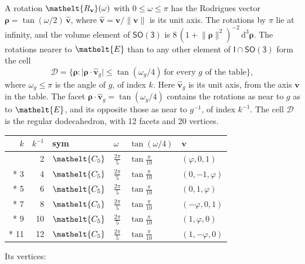 \documentclass[10pt,a4paper]{article}
\numberwithin{equation}{section}
\newcommand{\eltfont}[1]{{\let\sigma\eltsigma\mathelt{#1}}}
\newcommand{\grp}[1]{\mathsf{#1}}
\newcommand{\cls}[1]{\eltfont{#1}}
\newcommand{\elt}[1]{\eltfont{#1}}
\newcommand{\dirvec}[3]{(#1, #2, #3)}
\newcommand{\unitaxis}{\hat{\mathbf{v}}}
\newcommand{\vv}{\mathbf{v}}
\newcommand{\diff}{\mathrm{d}}
\newcommand{\goldenratio}{\varphi}
\newcommand{\rodrigues}{\boldsymbol{\rho}}
\newcommand{\fcell}{\mathcal{D}}
\begin{document}
\leavevmode\label{n:vector.rodrigues}\label{n:vector.unitaxis}A rotation $\elt{R_{\vv}}(\omega)$ with $0 \le \omega \le \pi$ has the Rodrigues vector $\rodrigues = \tan(\omega/2)\,\unitaxis$, where $\unitaxis = \vv/\lVert\vv\rVert$ is its unit axis. The rotations by $\pi$ lie at infinity, and the volume element of \href{SO3.pdf}{$\grp{SO(3)}$} is $8\,(1 + \lVert\rodrigues\rVert^2)^{-2}\,\diff^3\rodrigues$.
\leavevmode\label{n:set.cell}The rotations nearer to $\elt{E}$ than to any other element of $\grp{I} \cap \grp{SO(3)}$ form the cell
\begin{equation}\label{e:cell}\fcell = \bigl\{\rodrigues : \lvert\rodrigues\cdot\unitaxis_g\rvert \le \tan(\omega_g/4)\ \text{for every $g$ of the table}\bigr\},\end{equation}
where $\omega_g \le \pi$ is the angle of $g$, of index $k$. Here $\unitaxis_g$ is its unit axis, from the axis $\vv$ in the table. The facet $\rodrigues\cdot\unitaxis_g = \tan(\omega_g/4)$ contains the rotations as near to $g$ as to $\elt{E}$, and its opposite those as near to $g^{-1}$, of index $k^{-1}$. The cell $\fcell$ is the regular dodecahedron, with 12 facets and 20 vertices.
{\small{\renewcommand{\arraystretch}{1.3}\begin{longtable}{@{}rrllll@{}}\toprule
$k$ & $k^{-1}$ & sym & $\omega$ & $\tan(\omega/4)$ & $\vv$\\\midrule\endhead
\bottomrule\endfoot\endlastfoot
1 & 2 & $\cls{C_{5}}$ & $\tfrac{2\pi}{5}$ & $\tan\tfrac{\pi}{10}$ & $\dirvec{\goldenratio{}}{0}{1}$\\*
3 & 4 & $\cls{C_{5}}$ & $\tfrac{2\pi}{5}$ & $\tan\tfrac{\pi}{10}$ & $\dirvec{0}{-1}{\goldenratio{}}$\\*
5 & 6 & $\cls{C_{5}}$ & $\tfrac{2\pi}{5}$ & $\tan\tfrac{\pi}{10}$ & $\dirvec{0}{1}{\goldenratio{}}$\\*
7 & 8 & $\cls{C_{5}}$ & $\tfrac{2\pi}{5}$ & $\tan\tfrac{\pi}{10}$ & $\dirvec{-\goldenratio{}}{0}{1}$\\*
9 & 10 & $\cls{C_{5}}$ & $\tfrac{2\pi}{5}$ & $\tan\tfrac{\pi}{10}$ & $\dirvec{1}{\goldenratio{}}{0}$\\*
11 & 12 & $\cls{C_{5}}$ & $\tfrac{2\pi}{5}$ & $\tan\tfrac{\pi}{10}$ & $\dirvec{1}{-\goldenratio{}}{0}$\\
\bottomrule\end{longtable}}}
\leavevmode\label{n:head.vertex}Its vertices:
\end{document}
